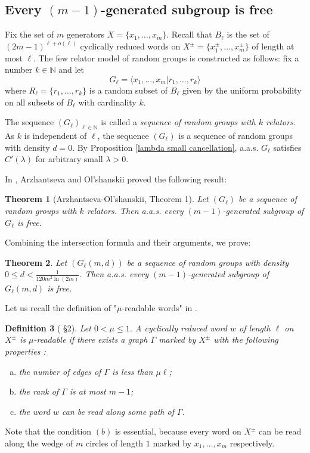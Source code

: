 \documentclass{article}
\newtheorem{thm}{Theorem}[section]
\newtheorem{defi}[thm]{Definition}
\theoremstyle{remark}
\begin{document}
\subsection{Every $(m-1)$-generated subgroup is free}
Fix the set of $m$ generators $X = \{x_1,\dots, x_m\}$. Recall that $B_\ell$ is the set of $(2m-1)^{\ell+o(\ell)}$ cyclically reduced words on $X^\pm = \{x_1^\pm,\dots, x_m^\pm\}$ of length at most $\ell$. The few relator model of random groups is constructed as follows: fix a number $k\in\mathbb{N}$ and let
\[G_\ell =\langle x_1,\dots, x_m | r_1,\dots,r_k \rangle\]
where $R_\ell = \{r_1,\dots,r_k\}$ is a random subset of $B_\ell$ given by the uniform probability on all subsets of $B_\ell$ with cardinality $k$.

The sequence $(G_\ell)_{\ell\in\mathbb{N}}$ is called a \textit{sequence of random groups with $k$ relators}. As $k$ is independent of $\ell$, the sequence $(G_\ell)$ is a sequence of random groups with density $d=0$. By Proposition \ref{lambda small cancellation}, a.a.s. $G_\ell$ satisfies $C'(\lambda)$ for arbitrary small $\lambda>0$.

In \cite{AO96}, Arzhantseva and Ol'shanskii proved the following result:
\begin{thm}[Arzhantseva-Ol'shanskii, \cite{AO96} Theorem 1]
Let $(G_\ell)$ be a sequence of random groups with $k$ relators. Then a.a.s. every $(m-1)$-generated subgroup of $G_\ell$ is free.
\end{thm}

Combining the intersection formula and their arguments, we prove:
\begin{thm} \label{AO with density}
Let $(G_\ell(m,d))$ be a sequence of random groups with density $0\leq d<\frac{1}{120m^2\ln(2m)}$. Then a.a.s. every $(m-1)$-generated subgroup of $G_\ell(m,d)$ is free.
\end{thm}\quad

Let us recall the definition of "$\mu$-readable words" in \cite{AO96}.

\begin{defi}[\cite{AO96} \S2] Let $0<\mu\leq 1$. A cyclically reduced word $w$ of length $\ell$ on $X^\pm$ is $\mu$-readable if there exists a graph $\Gamma$ marked by $X^\pm$ with the following properties :
\begin{enumerate}[(a)]
    \item the number of edges of $\Gamma$ is less than $\mu\ell$;
    \item the rank of $\Gamma$ is at most $m-1$;
    \item the word $w$ can be read along some path of $\Gamma$.
\end{enumerate}
\end{defi}
Note that the condition $(b)$ is essential, because every word on $X^\pm$ can be read along the wedge of $m$ circles of length $1$ marked by $x_1,\dots, x_m$ respectively.\\
\end{document}
